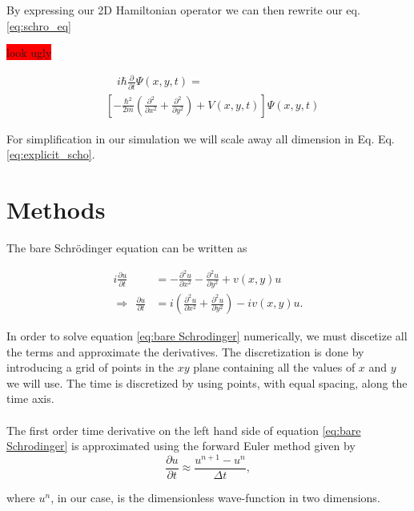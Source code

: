 \documentclass[english,notitlepage,reprint,nofootinbib]{revtex4-2}  %
\begin{document}
	By expressing our 2D Hamiltonian operator we can then rewrite our eq. \ref{eq:schro_eq} 
	
	
	\colorbox{red}{look ugly}
	
	\begin{align*}
		& \quad i \hbar \frac{\partial}{\partial t} \Psi(x, y, t)= \\
		& \left[-\frac{\hbar^{2}}{2 m}\left(\frac{\partial^{2}}{\partial x^{2}}+\frac{\partial^{2}}{\partial y^{2}}\right)+V(x, y, t)\right] \Psi(x, y, t) \tag{2} \label{eq:explicit_scho}
	\end{align*}
	
	
	For simplification in our simulation we will scale away all dimension in Eq.
	Eq. \ref{eq:explicit_scho}. 
	
	
	\section{Methods}\label{sec:methods}
	The bare Schrödinger equation can be written as 

	\begin{equation}\label{eq:bare Schrodinger}
		\begin{split}
		i \frac{\partial u}{\partial t} &= -\frac{\partial^2 u}{\partial x^2} - \frac{\partial^2 u}{\partial y^2} + v(x,y) u\\
		\Rightarrow \ \ \frac{\partial u}{\partial t} &= i\left(\frac{\partial^2 u}{\partial x^2} + \frac{\partial^2 u}{\partial y^2}\right) - iv(x,y) u.
		\end{split}
	\end{equation} 
	
	\noindent
	In order to solve equation \ref{eq:bare Schrodinger} numerically, we must discetize all the terms and approximate
	the derivatives. The discretization is done by introducing a grid of points in the
	$xy$ plane containing all the values of $x$ and $y$ we will use. The time is discretized by using points, with equal spacing, along the time axis.\\ \\
	The first order time derivative on the left hand side of equation \ref{eq:bare Schrodinger} is approximated using the forward Euler method given by
	\begin{equation}
		\frac{\partial u}{\partial t} \approx \frac{u^{n+1}-u^n}{\Delta t},
	\end{equation}


	where $u^n$, in our case, is the dimensionless wave-function in two dimensions.
\end{document}

